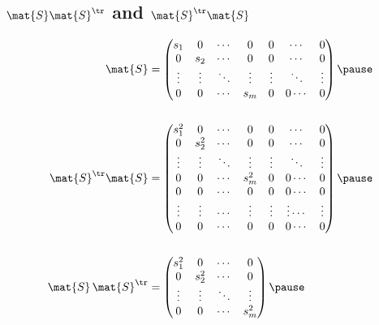 \begin{slide}
\section[-2]{$\mat{S}\mat{S}^\tr$ and $\mat{S}^\tr \mat{S}$}

\begin{PauseHighLight}\footnotesize
  \begin{align*}
    \mat{S} &=\begin{pmatrix}
        s_1 & 0 & \cdots & 0 & 0 & \cdots & 0 \\
        0 & s_2 &  \cdots & 0 & 0 & \cdots & 0 \\
        \vdots  & \vdots & \ddots & \vdots & \vdots & \ddots & \vdots \\
        0 & 0 & \cdots & s_m & 0 & 0 \cdots & 0
      \end{pmatrix}\pause
    \\
    \\
   \mat{S}^\tr \mat{S} &= \begin{pmatrix}
        s^2_1 & 0 &  \cdots & 0 & 0 & \cdots & 0 \\
        0 & s^2_2 &  \cdots & 0 & 0 & \cdots & 0 \\
        \vdots & \vdots  & \ddots & \vdots & \vdots & \ddots & \vdots \\
        0 & 0 & \cdots & s^2_m & 0 & 0 \cdots & 0 \\
        0 & 0 & \cdots & 0 & 0 & 0 \cdots & 0\\
        \vdots & \vdots & \cdots & \vdots & \vdots & \vdots \cdots & \vdots\\
        0 & 0 & \cdots & 0 & 0 & 0 \cdots & 0
      \end{pmatrix}\pause
    \\
    \\
    \mat{S}\,\mat{S}^\tr &= \begin{pmatrix}
        s^2_1 & 0 & \cdots & 0  \\
        0 & s^2_2 &  \cdots & 0 \\
        \vdots  & \vdots & \ddots & \vdots  \\
        0 & 0 & \cdots & s^2_m
      \end{pmatrix}\pause
  \end{align*}
\end{PauseHighLight}


\end{slide}



